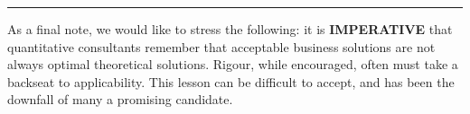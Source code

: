 \begin{center}
    \rule{0.5\textwidth}{.4pt}
\end{center}
As a final note, we would like to stress the following: it is \textbf{IMPERATIVE} that quantitative consultants remember that acceptable business solutions are not always optimal theoretical solutions. Rigour, while encouraged, often must take a backseat to applicability. This lesson can be difficult to accept, and has been the downfall of many a promising candidate.  
